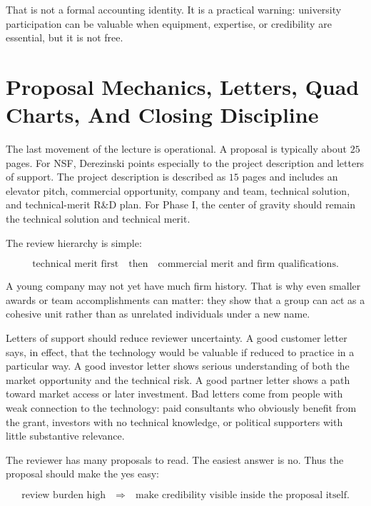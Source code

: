 That is not a formal accounting identity. It is a practical warning: university participation can be valuable when equipment, expertise, or credibility are essential, but it is not free.

\section{Proposal Mechanics, Letters, Quad Charts, And Closing Discipline}

The last movement of the lecture is operational. A proposal is typically about \(25\) pages. For NSF, Derezinski points especially to the project description and letters of support. The project description is described as \(15\) pages and includes an elevator pitch, commercial opportunity, company and team, technical solution, and technical-merit R\&D plan. For Phase I, the center of gravity should remain the technical solution and technical merit.

The review hierarchy is simple:

\begin{equation}
\text{technical merit first}
\quad\text{then}\quad
\text{commercial merit and firm qualifications.}
\end{equation}

A young company may not yet have much firm history. That is why even smaller awards or team accomplishments can matter: they show that a group can act as a cohesive unit rather than as unrelated individuals under a new name.

Letters of support should reduce reviewer uncertainty. A good customer letter says, in effect, that the technology would be valuable if reduced to practice in a particular way. A good investor letter shows serious understanding of both the market opportunity and the technical risk. A good partner letter shows a path toward market access or later investment. Bad letters come from people with weak connection to the technology: paid consultants who obviously benefit from the grant, investors with no technical knowledge, or political supporters with little substantive relevance.

The reviewer has many proposals to read. The easiest answer is no. Thus the proposal should make the yes easy:

\begin{equation}
\text{review burden high}
\quad\Rightarrow\quad
\text{make credibility visible inside the proposal itself.}
\end{equation}

